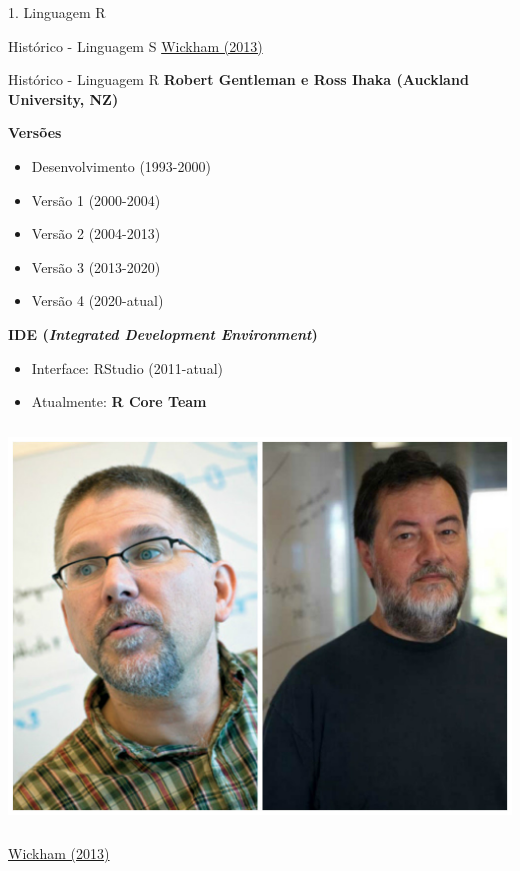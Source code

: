 \documentclass[
  ignorenonframetext,
]{beamer}
\providecommand{\tightlist}{%
  \setlength{\itemsep}{0pt}\setlength{\parskip}{0pt}}\usepackage{longtable,booktabs,array}
\begin{document}
\begin{frame}{1. Linguagem R}
\begin{block}{Histórico - Linguagem S}
\href{http://vita.had.co.nz/papers/r-s.pdf}{Wickham (2013)}
\end{block}

\begin{block}{Histórico - Linguagem R}
\protect\hypertarget{histuxf3rico---linguagem-r}{}
\textbf{Robert Gentleman e Ross Ihaka (Auckland University, NZ)}

\textbf{Versões}

\begin{itemize}
\tightlist
\item
  Desenvolvimento (1993-2000)
\item
  Versão 1 (2000-2004)
\item
  Versão 2 (2004-2013)
\item
  Versão 3 (2013-2020)
\item
  Versão 4 (2020-atual)
\end{itemize}

\textbf{IDE (\emph{Integrated Development Environment})}

\begin{itemize}
\tightlist
\item
  Interface: RStudio (2011-atual)
\item
  Atualmente: \textbf{R Core Team}
\end{itemize}

\includegraphics[width=5.72917in,height=4.16667in]{img/person_gentleman_ihaka.jpg}

\href{http://vita.had.co.nz/papers/r-s.pdf}{Wickham (2013)}
\end{block}


\end{frame}
\end{document}

